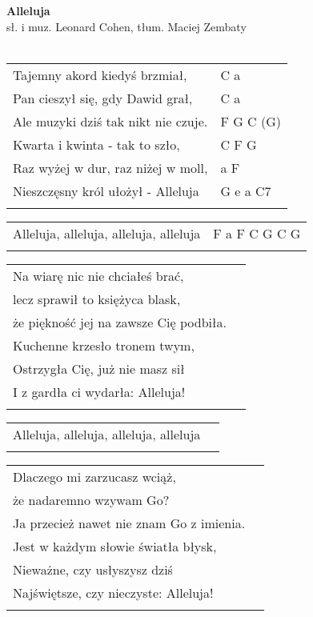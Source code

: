 \documentclass[a5paper]{article}
\begin{document}


\noindent
\fontsize{12pt}{15pt}\selectfont
\textbf{Alleluja} \\
\fontsize{8pt}{10pt}\selectfont
sł. i muz. Leonard Cohen, tłum. Maciej Zembaty \\ \\
\fontsize{10pt}{12pt}\selectfont
{}
\begin{tabular}{@{}p{8.5cm}p{3cm}@{}}
\noindent
Tajemny akord kiedyś brzmiał, & C a \\
Pan cieszył się, gdy Dawid grał, & C a\\
Ale muzyki dziś tak nikt nie czuje. & F G C (G) \\
Kwarta i kwinta - tak to szło, & C F G\\
Raz wyżej w dur, raz niżej w moll, & a F \\
Nieszczęsny król ułożył - Alleluja & G e a C7\\ \\
\end{tabular}

\noindent
\begin{tabular}{@{}p{7.5cm}p{3cm}@{}}
Alleluja, alleluja, alleluja, alleluja & F a F C G C G\\\\
\end{tabular}

\noindent
\begin{tabular}{@{}p{8.5cm}p{3cm}@{}}
Na wiarę nic nie chciałeś brać,\\
lecz sprawił to księżyca blask,\\
że piękność jej na zawsze Cię podbiła.\\
Kuchenne krzesło tronem twym,\\
Ostrzygła Cię, już nie masz sił\\
I z gardła ci wydarła: Alleluja!\\\\
\end{tabular}

\noindent
\begin{tabular}{@{}p{8.5cm}p{3cm}@{}}
Alleluja, alleluja, alleluja, alleluja\\\\
\end{tabular}

\noindent
\begin{tabular}{@{}p{8.5cm}p{3cm}@{}}
Dlaczego mi zarzucasz wciąż,\\
że nadaremno wzywam Go?\\
Ja przecież nawet nie znam Go z imienia.\\
Jest w każdym słowie światła błysk,\\
Nieważne, czy usłyszysz dziś\\
Najświętsze, czy nieczyste: Alleluja!\\\\
\end{tabular}
\end{document}

